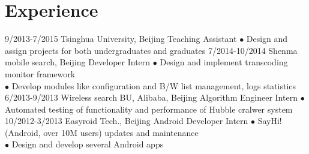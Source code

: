 \documentclass[]{friggeri-cv}
\begin{document}
\section{Experience}

\begin{entrylist}
  \entry
    {9/2013-7/2015}
    {Tsinghua University, Beijing}
    {Teaching Assistant}
    {$\bullet$ Design and assign projects for both undergraduates and graduates}
  \entry
    {7/2014-10/2014}
    {Shenma mobile search, Beijing}
    {Developer Intern}
    {$\bullet$ Design and implement transcoding monitor framework\\
    $\bullet$ Develop modules like configuration and B/W list management, logs statistics}
  \entry
    {6/2013-9/2013}
    {Wireless search BU, Alibaba, Beijing}
    {Algorithm Engineer Intern}
    {$\bullet$ Automated testing of functionality and performance of Hubble cralwer system}
  \entry
    {10/2012-3/2013}
    {Easyroid Tech., Beijing}
    {Android Developer Intern}
    {$\bullet$ SayHi!(Android, over 10M users) updates and maintenance\\
    $\bullet$ Design and develop several Android apps}
\end{entrylist}
\end{document}
